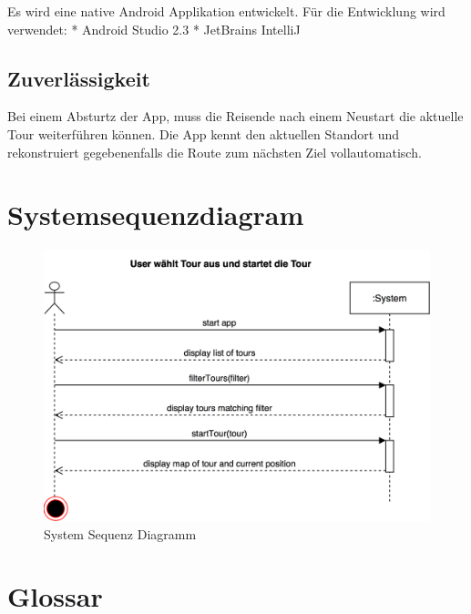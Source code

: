 \documentclass[a4paper,10pt,xetex]{article}
\begin{document}
Es wird eine native Android Applikation entwickelt. Für die Entwicklung
wird verwendet: * Android Studio 2.3 * JetBrains IntelliJ

\subsection{Zuverlässigkeit}\label{zuverluxe4ssigkeit}

Bei einem Absturtz der App, muss die Reisende nach einem Neustart die
aktuelle Tour weiterführen können. Die App kennt den aktuellen Standort
und rekonstruiert gegebenenfalls die Route zum nächsten Ziel
vollautomatisch.

\section{Systemsequenzdiagram}\label{systemsequenzdiagram}

\begin{figure}
\centering
\includegraphics{UC1_SystemSequenzDiagram.png}
\caption{System Sequenz Diagramm}
\end{figure}

\section{Glossar}\label{glossar}
\end{document}

